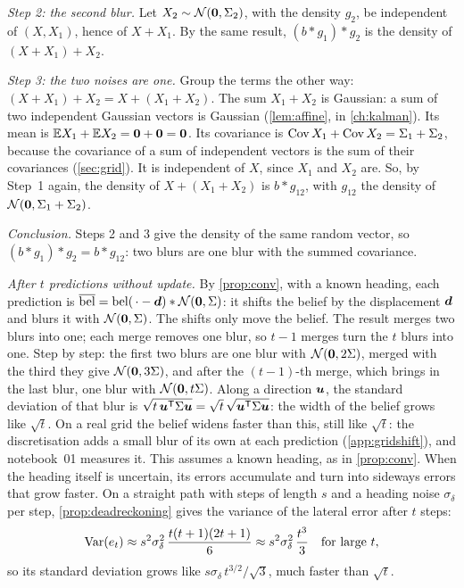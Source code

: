\emph{Step 2: the second blur.} Let $X_2\sim\mathcal{N}(\bm{0},\Sigma_2)$,
with the density $g_2$, be independent of $(X,X_1)$, hence of $X+X_1$. By
the same result, $(b\ast g_1)\ast g_2$ is the density of $(X+X_1)+X_2$.

\emph{Step 3: the two noises are one.} Group the terms the other way:
$(X+X_1)+X_2=X+(X_1+X_2)$. The sum $X_1+X_2$ is Gaussian: a sum of two
independent Gaussian vectors is Gaussian (\cref{lem:affine}, in
\cref{ch:kalman}). Its mean is $\mathbb{E} X_1+\mathbb{E} X_2=\bm{0}+\bm{0}=\bm{0}$. Its
covariance is $\operatorname{Cov} X_1+\operatorname{Cov} X_2=\Sigma_1+\Sigma_2$, because the
covariance of a sum of independent vectors is the sum of their
covariances (\cref{sec:grid}). It is
independent of $X$, since $X_1$ and $X_2$ are. So, by Step~1 again, the
density of $X+(X_1+X_2)$ is $b\ast g_{12}$, with $g_{12}$ the density of
$\mathcal{N}(\bm{0},\Sigma_1+\Sigma_2)$.

\emph{Conclusion.} Steps 2 and 3 give the density of the same random
vector, so $(b\ast g_1)\ast g_2=b\ast g_{12}$: two blurs are one blur with
the summed covariance.

\emph{After $t$ predictions without update.} By \cref{prop:conv}, with a
known heading, each prediction is
$\overline{\operatorname{bel}}=\operatorname{bel}(\,\cdot-\bm{d})\ast\mathcal{N}(\bm{0},\Sigma)$: it shifts the
belief by the displacement $\bm{d}$ and blurs it with
$\mathcal{N}(\bm{0},\Sigma)$. The shifts only move the belief. The result merges two blurs into one; each merge removes one blur, so
$t-1$ merges turn the $t$ blurs into one. Step by step: the first two
blurs are one blur with $\mathcal{N}(\bm{0},2\Sigma)$, merged with the third
they give $\mathcal{N}(\bm{0},3\Sigma)$, and after the $(t-1)$-th merge, which
brings in the last blur, one blur with $\mathcal{N}(\bm{0},t\Sigma)$. Along a direction
$\bm{u}$, the standard deviation of that blur is
$\sqrt{t\,\bm{u}^{\mathsf{T}}\Sigma\bm{u}}=\sqrt t\,\sqrt{\bm{u}^{\mathsf{T}}\Sigma\bm{u}}$:
the width of the belief grows like $\sqrt t$. On a real grid the belief widens faster than this, still like $\sqrt t$:
the discretisation adds a small blur of its own at each prediction
(\cref{app:gridshift}), and notebook~01 measures it. This assumes a known heading, as in
\cref{prop:conv}. When the heading itself is
uncertain, its errors accumulate and turn into sideways errors that grow
faster. On a straight path with steps of length $s$ and a heading noise
$\sigma_\delta$ per step, \cref{prop:deadreckoning} gives the variance of
the lateral error after $t$ steps:
\[
  \operatorname{Var}(e_t)\approx s^2\sigma_\delta^2\,\frac{t(t+1)(2t+1)}{6}
  \approx s^2\sigma_\delta^2\,\frac{t^3}{3}\quad\text{for large }t,
\]
so its standard deviation grows like $s\sigma_\delta\,t^{3/2}/\sqrt3$,
much faster than $\sqrt t$.

